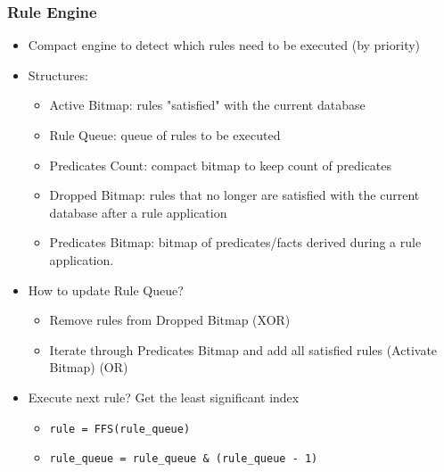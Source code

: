 \documentclass{beamer}
\begin{document}
\begin{frame}[fragile]
   \frametitle{Rule Engine}
   \begin{itemize}
      \item Compact engine to detect which rules need to be executed (by priority)
      \item Structures:
      \begin{itemize}
         \item Active Bitmap: rules "satisfied" with the current database
         \item Rule Queue: queue of rules to be executed
         \item Predicates Count: compact bitmap to keep count of predicates
         \item Dropped Bitmap: rules that no longer are satisfied with the current database after a rule application
         \item Predicates Bitmap: bitmap of predicates/facts derived during a rule application.

      \end{itemize}
      \item How to update Rule Queue?
      \begin{itemize}
         \item Remove rules from Dropped Bitmap (XOR)
         \item Iterate through Predicates Bitmap and add all satisfied rules (Activate Bitmap) (OR)
      \end{itemize}
      \item Execute next rule? Get the least significant index
      \begin{itemize}
         \item \texttt{rule = FFS(rule\_queue)}
         \item \texttt{rule\_queue = rule\_queue \& (rule\_queue - 1)}
      \end{itemize}
   \end{itemize}
\end{frame}
\end{document}
